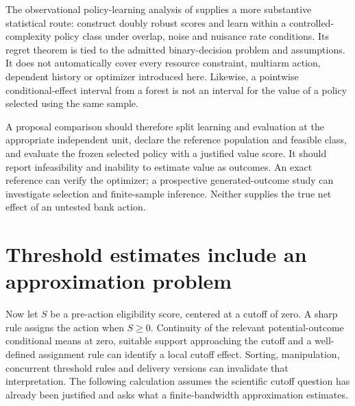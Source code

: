 The observational policy-learning analysis of \citet{policy2021} supplies a
more substantive statistical route: construct doubly robust scores and learn
within a controlled-complexity policy class under overlap, noise and nuisance
rate conditions. Its regret theorem is tied to the admitted binary-decision
problem and assumptions. It does not automatically cover every resource
constraint, multiarm action, dependent history or optimizer introduced here.
Likewise, a pointwise conditional-effect interval from a forest is not an
interval for the value of a policy selected using the same sample.

A proposal comparison should therefore split learning and evaluation at the
appropriate independent unit, declare the reference population and feasible
class, and evaluate the frozen selected policy with a justified value score.
It should report infeasibility and inability to estimate value as outcomes.
An exact reference can verify the optimizer; a prospective generated-outcome
study can investigate selection and finite-sample inference. Neither supplies
the true net effect of an untested bank action.

\section{Threshold estimates include an approximation problem}
\label{exec17:s4-curvature}

Now let $S$ be a pre-action eligibility score, centered at a cutoff of zero.
A sharp rule assigns the action when $S\geq0$. Continuity of the relevant
potential-outcome conditional means at zero, suitable support approaching
the cutoff and a well-defined assignment rule can identify a local cutoff
effect. Sorting, manipulation, concurrent threshold rules and delivery
versions can invalidate that interpretation. The following calculation
assumes the scientific cutoff question has already been justified and asks
what a finite-bandwidth approximation estimates.

